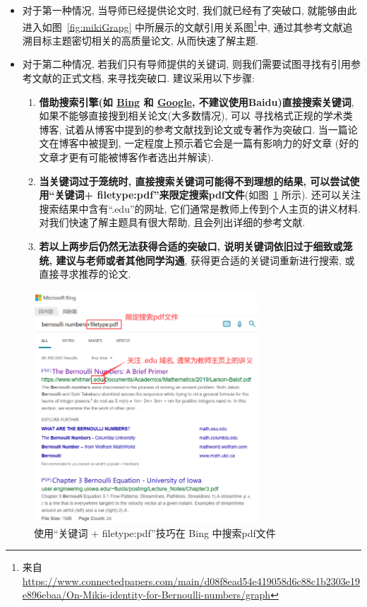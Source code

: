\documentclass{formatBook}
\begin{document}
\begin{itemize}
    \item 对于第一种情况, 当导师已经提供论文时, 我们就已经有了突破口, 就能够由此进入如图~\ref{fig:mikiGrapg} 中所展示的文献引用关系图\footnote{来自\url{https://www.connectedpapers.com/main/d08f8ead54e419058d6c88c1b2303e19e896ebaa/On-Mikis-identity-for-Bernoulli-numbers/graph}}中, 通过其参考文献追溯目标主题密切相关的高质量论文, 从而快速了解主题.
    \item 对于第二种情况, 若我们只有导师提供的关键词, 则我们需要试图寻找有引用参考文献的正式文档, 来寻找突破口. 建议采用以下步骤: 
\begin{enumerate}
    \item \textbf{借助搜索引擎(如 \href{https://www.bing.com/}{Bing} 和 \href{https://www.google.com/}{Google}, 不建议使用Baidu)直接搜索关键词}, 如果不能够直接搜到相关论文(大多数情况), 可以 寻找格式正规的学术类博客, 试着从博客中提到的参考文献找到论文或专著作为突破口. 当一篇论文在博客中被提到, 一定程度上预示着它会是一篇有影响力的好文章 (好的文章才更有可能被博客作者选出并解读).
    \item \textbf{当关键词过于笼统时, 直接搜索关键词可能得不到理想的结果, 可以尝试使用``关键词+ filetype:pdf''来限定搜索pdf文件}(如图~\ref{fig:bing} 所示). 还可以关注搜索结果中含有``.edu''的网址, 它们通常是教师上传到个人主页的讲义材料.  对我们快速了解主题具有很大帮助, 且会列出详细的参考文献.
    \item \textbf{若以上两步后仍然无法获得合适的突破口, 说明关键词依旧过于细致或笼统, 建议与老师或者其他同学沟通}, 获得更合适的关键词重新进行搜索, 或直接寻求推荐的论文.
\end{enumerate}
\end{itemize}

\begin{figure}[H]
    \centering
    \includegraphics[width=0.75\textwidth]{figure/bingSearch.png}
    \caption{使用``关键词 + filetype:pdf''技巧在 Bing 中搜索pdf文件}
    \label{fig:bing}
\end{figure}
\end{document}
